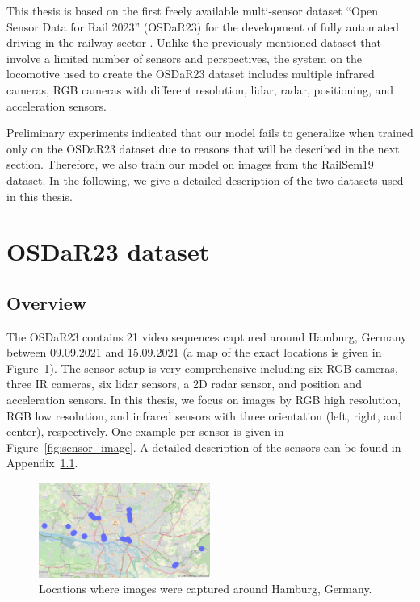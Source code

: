 \documentclass[Master,MDS,english]{BASE/twbook} %
\begin{document}
This thesis is based on the first freely available multi-sensor dataset ``Open Sensor Data for Rail 2023'' (OSDaR23) for the development of fully automated driving in the railway sector \citep{DB2023, tagiew2023osdar23}.
Unlike the previously mentioned dataset that involve a limited number of sensors and perspectives, the system on the locomotive used to create the OSDaR23 dataset includes multiple infrared cameras, RGB cameras with different resolution, lidar, radar, positioning, and acceleration sensors.

Preliminary experiments indicated that our model fails to generalize when trained only on the OSDaR23 dataset due to reasons that will be described in the next section. Therefore, we also train our model on images from the RailSem19 dataset.
In the following, we give a detailed description of the two datasets used in this thesis.


\section{OSDaR23 dataset}

\subsection{Overview}

The OSDaR23 contains 21 video sequences captured around Hamburg, Germany between 09.09.2021 and 15.09.2021 (a map of the exact locations is given in Figure~\ref{fig:map}). 
The sensor setup is very comprehensive including six RGB cameras, three
IR cameras, six lidar sensors, a 2D radar sensor, and position and acceleration sensors. In this thesis, we focus on images by RGB high resolution, RGB low resolution, and infrared sensors with three orientation (left, right, and center), respectively. One example per sensor is given in Figure~\ref{fig:sensor_image}. A detailed description of the sensors can be found in Appendix~\ref{}.

\begin{figure}[h]
\centering
\includegraphics[width=0.5\textwidth]{images/datasets/db/map}
\caption{Locations where images were captured around Hamburg, Germany. }
\label{fig:map}
\end{figure}
\end{document}
